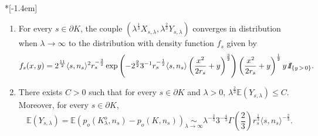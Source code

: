 \documentclass[10pt]{amsart}
\theoremstyle{definition}\newtheorem{defi}[theo]{Definition}\newtheorem{rema}[theo]{Remark}\newtheorem{exam}[theo]{Example}\newtheorem{exem}[theo]{Example}\newtheorem{nota}[theo]{Notation}
\newcommand{\indicat}{{\text{1}}\negthickspace\text{I}}
\newcommand{\E}{\mathbb{E}}
\newcommand{\noi}{\noindent}
\newcommand*{\romanenumi}{\renewcommand*{\theenumi}{\roman{enumi}}}
\begin{document}
\begin{prop}\label{prop:supportsmooth}\ \\*[-1.4em]
\begin{enumerate}\romanenumi
\item \label{eq:ftheta}For every $s\in\partial K$, the couple $(\lambda^{\frac1{3}}X_{s,\lambda}, \lambda^{\frac{2}{3}}Y_{s,\lambda})$ converges in distribution when $\lambda\to\infty$ to the distribution with density function $f_s$ given by
\[
f_s(x,y)=2^{\frac{11}{2}}\langle s,n_s\rangle^2 r_s^{-\frac{3}{2}}\exp\left(-2^{\frac{9}{2}} 3^{-1}r_s^{-\frac1{2}}\langle s,n_s\rangle
\left(\frac{x^2}{2r_s}+y\right)^{\frac{3}{2}}\right)\left(\frac{x^2}{2r_s}+y\right)^{\frac1{2}}y{\emph{\indicat}}_{\{y\,>\,0\}}.
\]
\item \label{eq:convmean}There exists $C>0$ such that for every $s\in\partial K$ and $\lambda>0$, $\lambda^{\frac{2}{3}}\E(Y_{s,\lambda})\le C$. Moreover, for every $s\in\partial K$,
\[
\E(Y_{s,\lambda})=\E\left(p_o\left(K_{\lambda}^o,n_s\right)-p_o(K,n_s)\right)\underset{\lambda\to\infty}{\sim}\lambda^{-\frac{2}{3}}3^{-\frac{4}{3}}\Gamma\left(\frac{2}{3}\right) r_s^{\frac1{3}}\langle s,n_s\rangle^{-\frac{2}{3}}.
\]
\end{enumerate}
\end{prop}
\end{document}
